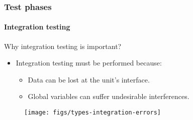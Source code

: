\begin{frame}
\frametitle{Test phases}
\framesubtitle{Integration testing}

\begin{block:fact}{Why integration testing is important?}
\begin{itemize}
	\item Integration testing must be performed because:
	\begin{itemize}
		\item Data can be lost at the unit's interface.

		\item Global variables can suffer undesirable interferences.
	\end{itemize}
\end{itemize}
\end{block:fact}

\begin{figure}
    \centering
    \texttt{[image: figs/types-integration-errors]}
\end{figure}
\end{frame}



